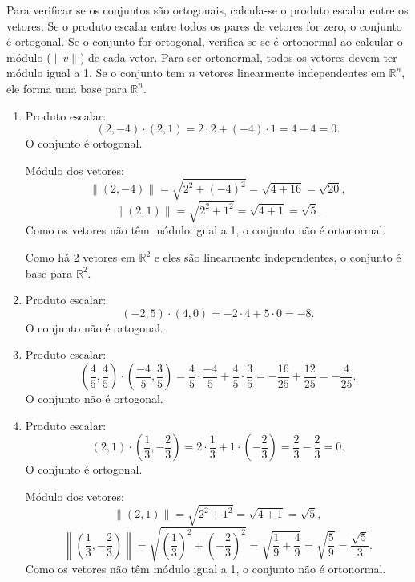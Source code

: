 \begin{resolution}
  Para verificar se os conjuntos são ortogonais, calcula-se o produto escalar entre os vetores. Se o produto escalar entre todos os pares de vetores for zero, o conjunto é ortogonal. Se o conjunto for ortogonal, verifica-se se é ortonormal ao calcular o módulo (\(\|v\|\)) de cada vetor. Para ser ortonormal, todos os vetores devem ter módulo igual a 1. Se o conjunto tem \(n\) vetores linearmente independentes em \(\mathbb{R}^n\), ele forma uma base para \(\mathbb{R}^n\).

  \begin{enumerate}[label=\alph*)]
    \item Produto escalar:
          \[
            (2, -4) \cdot (2, 1) = 2 \cdot 2 + (-4) \cdot 1 = 4 - 4 = 0.
          \]
          O conjunto é ortogonal.

          Módulo dos vetores:
          \[
            \|(2, -4)\| = \sqrt{2^2 + (-4)^2} = \sqrt{4 + 16} = \sqrt{20},
          \]
          \[
            \|(2, 1)\| = \sqrt{2^2 + 1^2} = \sqrt{4 + 1} = \sqrt{5}.
          \]
          Como os vetores não têm módulo igual a 1, o conjunto não é ortonormal.

          Como há 2 vetores em \(\mathbb{R}^2\) e eles são linearmente independentes, o conjunto é base para \(\mathbb{R}^2\).

    \item Produto escalar:
          \[
            (-2, 5) \cdot (4, 0) = -2 \cdot 4 + 5 \cdot 0 = -8.
          \]
          O conjunto não é ortogonal.

    \item  Produto escalar:
          \[
            \left(\frac{4}{5}, \frac{4}{5}\right) \cdot \left(\frac{-4}{5}, \frac{3}{5}\right) = \frac{4}{5} \cdot \frac{-4}{5} + \frac{4}{5} \cdot \frac{3}{5} = -\frac{16}{25} + \frac{12}{25} = -\frac{4}{25}.
          \]
          O conjunto não é ortogonal.


    \item Produto escalar:
          \[
            (2, 1) \cdot \left(\frac{1}{3}, -\frac{2}{3}\right) = 2 \cdot \frac{1}{3} + 1 \cdot \left(-\frac{2}{3}\right) = \frac{2}{3} - \frac{2}{3} = 0.
          \]
          O conjunto é ortogonal.

          Módulo dos vetores:
          \[
            \|(2, 1)\| = \sqrt{2^2 + 1^2} = \sqrt{4 + 1} = \sqrt{5},
          \]
          \[
            \left\|\left(\frac{1}{3}, -\frac{2}{3}\right)\right\| = \sqrt{\left(\frac{1}{3}\right)^2 + \left(-\frac{2}{3}\right)^2} = \sqrt{\frac{1}{9} + \frac{4}{9}} = \sqrt{\frac{5}{9}} = \frac{\sqrt{5}}{3}.
          \]
          Como os vetores não têm módulo igual a 1, o conjunto não é ortonormal.


\end{enumerate}
\end{resolution}
